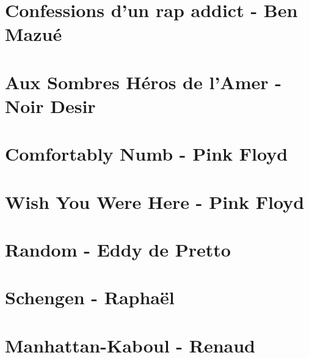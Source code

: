 \documentclass{guitartabs}
\begin{document}
\section{Confessions d'un rap addict - Ben Mazué}
\begin{guitar}

\end{guitar}

\section{Aux Sombres Héros de l'Amer - Noir Desir}
\begin{guitar}

\end{guitar}



\section{Comfortably Numb - Pink Floyd}
\begin{guitar}

\end{guitar}

\section{Wish You Were Here - Pink Floyd}
\begin{guitar}

\end{guitar}


\section{Random - Eddy de Pretto}
\begin{guitar}

\end{guitar}


\section{Schengen - Raphaël}
\begin{guitar}

\end{guitar}

\section{Manhattan-Kaboul - Renaud}
\begin{guitar}

\end{guitar}
\end{document}
